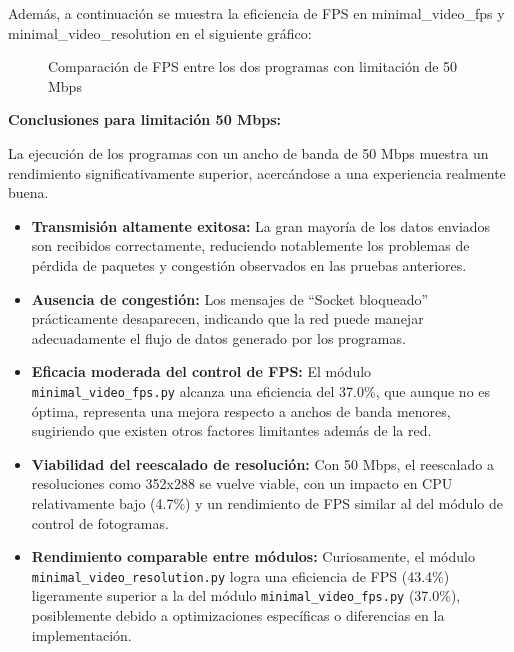 Además, a continuación se muestra la eficiencia de FPS en minimal\_video\_fps y minimal\_video\_resolution en el siguiente gráfico:
\begin{figure}[H]
\centering
{}
\caption{Comparación de FPS entre los dos programas con limitación de 50 Mbps}
\label{fig:comparacionfps_50mb}
\end{figure}

\textbf{Conclusiones para limitación 50 Mbps:}

La ejecución de los programas con un ancho de banda de 50 Mbps muestra un rendimiento significativamente superior, acercándose a una experiencia realmente buena.
\begin{itemize}
    \item \textbf{Transmisión altamente exitosa:} La gran mayoría de los datos enviados son recibidos correctamente, reduciendo notablemente los problemas de pérdida de paquetes y congestión observados en las pruebas anteriores.
    \item \textbf{Ausencia de congestión:} Los mensajes de ``Socket bloqueado'' prácticamente desaparecen, indicando que la red puede manejar adecuadamente el flujo de datos generado por los programas.
    \item \textbf{Eficacia moderada del control de FPS:} El módulo \texttt{minimal\_video\_fps.py} alcanza una eficiencia del 37.0\%, que aunque no es óptima, representa una mejora respecto a anchos de banda menores, sugiriendo que existen otros factores limitantes además de la red.
    \item \textbf{Viabilidad del reescalado de resolución:} Con 50 Mbps, el reescalado a resoluciones como 352x288 se vuelve viable, con un impacto en CPU relativamente bajo (4.7\%) y un rendimiento de FPS similar al del módulo de control de fotogramas.
    \item \textbf{Rendimiento comparable entre módulos:} Curiosamente, el módulo \texttt{minimal\_video\_resolution.py} logra una eficiencia de FPS (43.4\%) ligeramente superior a la del módulo \texttt{minimal\_video\_fps.py} (37.0\%), posiblemente debido a optimizaciones específicas o diferencias en la implementación.
\end{itemize}

